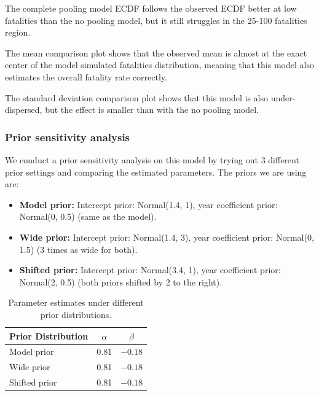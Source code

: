 \documentclass[12pt,a4paper]{article}
\begin{document}
The complete pooling model ECDF follows the observed ECDF better at low fatalities than the no pooling model, but it still struggles in the 25-100 fatalities region.

The mean comparison plot shows that the observed mean is almost at the exact center of the model simulated fatalities distribution, meaning that this model also estimates the overall fatality rate correctly.

The standard deviation comparison plot shows that this model is also under-dispersed, but the effect is smaller than with the no pooling model.


\subsubsection*{Prior sensitivity analysis}

We conduct a prior sensitivity analysis on this model by trying out 3 different prior settings and comparing the estimated parameters. The priors we are using are:
\begin{itemize}
  \item \textbf{Model prior:} Intercept prior: Normal(1.4, 1), year coefficient prior: Normal(0, 0.5) (same as the model).

  \item \textbf{Wide prior:} Intercept prior: Normal(1.4, 3), year coefficient prior: Normal(0, 1.5) (3 times as wide for both).

  \item \textbf{Shifted prior:} Intercept prior: Normal(3.4, 1), year coefficient prior: Normal(2, 0.5) (both priors shifted by 2 to the right).
\end{itemize}

\begin{table}[h]
  \centering
  \begin{tabular}{lcc}
    \hline
    \textbf{Prior Distribution} & \textbf{$\alpha$} & \textbf{$\beta$} \\
    \hline
    Model prior                 & 0.81              & $-0.18$          \\
    Wide prior                  & 0.81              & $-0.18$          \\
    Shifted prior               & 0.81              & $-0.18$          \\
    \hline
  \end{tabular}
  \caption{Parameter estimates under different prior distributions.}
  \label{tab:model_comparison}
\end{table}
\end{document}
